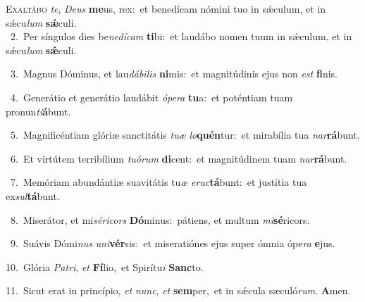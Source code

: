 \lettrine{\initial\textcolor{\initialcolor}{E}}{xaltábo} \textit{te}\-, \textit{De}\-\textit{us} \textbf{me}\-us, rex:~\star et benedícam nómini tuo in sǽculum, et in sǽcu\textit{lum} \textbf{sǽ}\-culi.\\
{\numbfont\textcolor{\numbcolor}{~2.}}~Per síngulos dies be\-\textit{ne}\-\textit{dí}\textit{cam} \textbf{ti}\-bi:~\star et laudábo nomen tuum in sǽculum, et in sǽcu\textit{lum} \textbf{sǽ}\-culi.\par
{\numbfont\textcolor{\numbcolor}{~3.}}~Magnus Dóminus, et lau\-\textit{dá}\-\textit{bi}\textit{lis} \textbf{ni}\-mis:~\star et magnitúdinis ejus non \textit{est} \textbf{fi}\-nis.\par
{\numbfont\textcolor{\numbcolor}{~4.}}~Generátio et generátio laudábit \textit{ó}\-\textit{pe}\textit{ra} \textbf{tu}\-a:~\star et poténtiam tuam pronun\-\textit{ti}\-\textbf{á}bunt.\par
{\numbfont\textcolor{\numbcolor}{~5.}}~Magnificéntiam glóriæ sanctitátis \textit{tu}\-\textit{æ} \textit{lo}\-\textbf{quén}tur:~\star et mirabília tua \textit{nar}\-\textbf{rá}bunt.\par
{\numbfont\textcolor{\numbcolor}{~6.}}~Et virtútem terribílium \textit{tu}\-\textit{ó}\textit{rum} \textbf{di}\-cent:~\star et magnitúdinem tuam \textit{nar}\-\textbf{rá}bunt.\par
{\numbfont\textcolor{\numbcolor}{~7.}}~Memóriam abundántiæ suavitátis tu\textit{æ} \textit{e}\-\textit{ruc}\textbf{tá}bunt:~\star et justítia tua ex\-\textit{sul}\-\textbf{tá}bunt.\par
{\numbfont\textcolor{\numbcolor}{~8.}}~Miserátor, et mi\-\textit{sé}\-\textit{ri}\textit{cors} \textbf{Dó}\-minus:~\star pátiens, et multum \textit{mi}\-\textbf{sé}ricors.\par
{\numbfont\textcolor{\numbcolor}{~9.}}~Suávis Dómi\textit{nus} \textit{u}\-\textit{ni}\textbf{vér}sis:~\star et miseratiónes ejus super ómnia ópe\textit{ra} \textbf{e}\-jus.\par
{\numbfont\textcolor{\numbcolor}{10.}}~Glória \textit{Pa}\-\textit{tri}, \textit{et} \textbf{Fí}\-lio,~\star et Spirítu\textit{i} \textbf{Sanc}\-to.\par
{\numbfont\textcolor{\numbcolor}{11.}}~Sicut erat in princípio, \textit{et} \textit{nunc}\-, \textit{et} \textbf{sem}\-per,~\star et in sǽcula sæculó\-\textit{rum}\-. \textbf{A}\-men.\par
